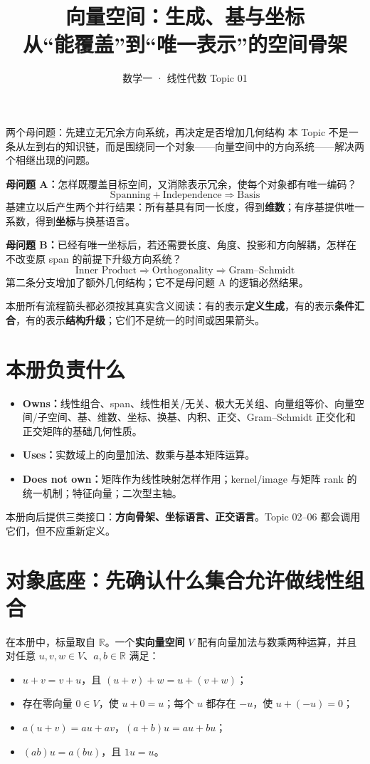 \documentclass[11pt,a4paper]{ctexart}
\title{\vspace{-1.1cm}\textbf{向量空间：生成、基与坐标}\\[0.4em]
\large 从“能覆盖”到“唯一表示”的空间骨架}
\author{数学一 · 线性代数 Topic 01}
\date{}
\newcommand{\kw}[1]{\textbf{\color{deep}#1}}
\begin{document}
\maketitle

\begin{corebox}{两个母问题：先建立无冗余方向系统，再决定是否增加几何结构}
本 Topic 不是一条从左到右的知识链，而是围绕同一个对象——向量空间中的方向系统——解决两个相继出现的问题。

\kw{母问题 A：}怎样既覆盖目标空间，又消除表示冗余，使每个对象都有唯一编码？
\[
\boxed{\text{Spanning}+\text{Independence}\Longrightarrow\text{Basis}}
\]
基建立以后产生两个并行结果：所有基具有同一长度，得到\kw{维数}；有序基提供唯一系数，得到\kw{坐标}与换基语言。

\kw{母问题 B：}已经有唯一坐标后，若还需要长度、角度、投影和方向解耦，怎样在不改变原 span 的前提下升级方向系统？
\[
\boxed{\text{Inner Product}\Longrightarrow\text{Orthogonality}\Longrightarrow\text{Gram--Schmidt}}
\]
第二条分支增加了额外几何结构；它不是母问题 A 的逻辑必然结果。
\end{corebox}

本册所有流程箭头都必须按其真实含义阅读：有的表示\kw{定义生成}，有的表示\kw{条件汇合}，有的表示\kw{结构升级}；它们不是统一的时间或因果箭头。

\section{本册负责什么}

\begin{itemize}
  \item \kw{Owns：}线性组合、span、线性相关/无关、极大无关组、向量组等价、向量空间/子空间、基、维数、坐标、换基、内积、正交、Gram--Schmidt 正交化和正交矩阵的基础几何性质。
  \item \kw{Uses：}实数域上的向量加法、数乘与基本矩阵运算。
  \item \kw{Does not own：}矩阵作为线性映射怎样作用；kernel/image 与矩阵 rank 的统一机制；特征向量；二次型主轴。
\end{itemize}

本册向后提供三类接口：\kw{方向骨架、坐标语言、正交语言}。Topic 02--06 都会调用它们，但不应重新定义。

\section{对象底座：先确认什么集合允许做线性组合}

在本册中，标量取自 $\mathbb R$。一个\kw{实向量空间} $V$ 配有向量加法与数乘两种运算，并且对任意 $u,v,w\in V$、$a,b\in\mathbb R$ 满足：
\begin{itemize}
  \item $u+v=v+u$，且 $(u+v)+w=u+(v+w)$；
  \item 存在零向量 $0\in V$，使 $u+0=u$；每个 $u$ 都存在 $-u$，使 $u+(-u)=0$；
  \item $a(u+v)=au+av$，$(a+b)u=au+bu$；
  \item $(ab)u=a(bu)$，且 $1u=u$。
\end{itemize}
\end{document}
